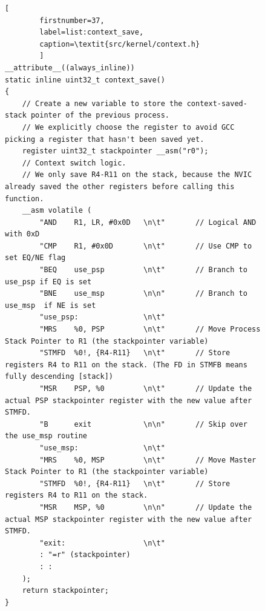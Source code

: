 \begin{figure}
\lstset{
	language=C,
	basicstyle=\footnotesize,
	showspaces=false,
	showtabs=false,
	showstringspaces=false,
	tabsize=4,
	breaklines=true
}
	\begin{lstlisting}[
		firstnumber=37,
		label=list:context_save,
		caption=\textit{src/kernel/context.h}
		]
__attribute__((always_inline))
static inline uint32_t context_save()
{
	// Create a new variable to store the context-saved-stack pointer of the previous process.
    // We explicitly choose the register to avoid GCC picking a register that hasn't been saved yet.
	register uint32_t stackpointer __asm("r0");
	// Context switch logic.
    // We only save R4-R11 on the stack, because the NVIC already saved the other registers before calling this function.
    __asm volatile (
        "AND	R1, LR, #0x0D	\n\t"		// Logical AND with 0xD
        "CMP    R1, #0x0D		\n\t"		// Use CMP to set EQ/NE flag
        "BEQ    use_psp			\n\t"		// Branch to use_psp if EQ is set
        "BNE    use_msp		 	\n\n"		// Branch to use_msp  if NE is set
        "use_psp:				\n\t"
        "MRS    %0, PSP			\n\t"		// Move Process Stack Pointer to R1 (the stackpointer variable)
        "STMFD  %0!, {R4-R11}   \n\t"		// Store registers R4 to R11 on the stack. (The FD in STMFB means fully descending [stack])
        "MSR    PSP, %0         \n\t"		// Update the actual PSP stackpointer register with the new value after STMFD.
        "B      exit			\n\n"		// Skip over the use_msp routine
        "use_msp:				\n\t"
        "MRS    %0, MSP			\n\t"		// Move Master Stack Pointer to R1 (the stackpointer variable)
        "STMFD  %0!, {R4-R11}   \n\t"		// Store registers R4 to R11 on the stack.
        "MSR    MSP, %0         \n\n"		// Update the actual MSP stackpointer register with the new value after STMFD.
        "exit:                  \n\t"
        : "=r" (stackpointer)
        : :
    );
    return stackpointer;
}
	\end{lstlisting}
\end{figure}

